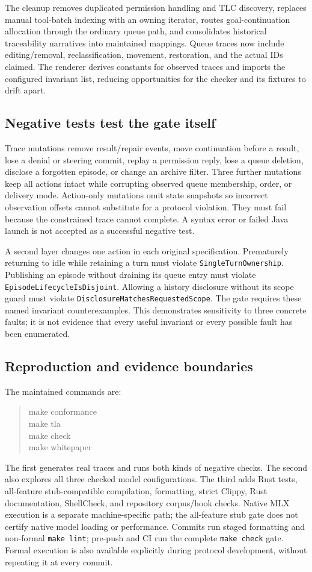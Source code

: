 \documentclass[10pt,letterpaper]{article}
\newcommand{\code}[1]{\texttt{#1}}
\begin{document}
The cleanup removes duplicated permission handling and TLC discovery, replaces
manual tool-batch indexing with an owning iterator, routes goal-continuation
allocation through the ordinary queue path, and consolidates historical
traceability narratives into maintained mappings. Queue traces now include
editing/removal, reclassification, movement, restoration, and the actual IDs
claimed. The renderer derives constants for observed traces and imports the
configured invariant list, reducing opportunities for the checker and its
fixtures to drift apart.

\subsection{Negative tests test the gate itself}
Trace mutations remove result/repair events, move continuation before a
result, lose a denial or steering commit, replay a permission reply, lose a
queue deletion, disclose a forgotten episode, or change an archive filter.
Three further mutations keep all actions intact while corrupting observed queue
membership, order, or delivery mode. Action-only mutations omit state snapshots
so incorrect observation offsets cannot substitute for a protocol violation.
They must fail because the constrained trace cannot complete. A syntax error
or failed Java launch is not accepted as a successful negative test.

A second layer changes one action in each original specification. Prematurely
returning to idle while retaining a turn must violate
\code{SingleTurnOwnership}. Publishing an episode without draining its queue
entry must violate \code{EpisodeLifecycleIsDisjoint}. Allowing a history
disclosure without its scope guard must violate
\code{DisclosureMatchesRequestedScope}. The gate requires these named
invariant counterexamples. This demonstrates sensitivity to three concrete
faults; it is not evidence that every useful invariant or every possible fault
has been enumerated.

\subsection{Reproduction and evidence boundaries}


The maintained commands are:
\begin{quote}\small\ttfamily
make conformance\\
make tla\\
make check\\
make whitepaper
\end{quote}
The first generates real traces and runs both kinds of negative checks. The
second also explores all three checked model configurations. The third adds
Rust tests, all-feature stub-compatible compilation, formatting, strict Clippy,
Rust documentation, ShellCheck, and repository corpus/hook checks. Native MLX
execution is a separate machine-specific path; the all-feature stub gate does
not certify native model loading or performance.
Commits run staged formatting and non-formal \code{make lint}; pre-push and CI
run the complete \code{make check} gate. Formal execution is also available
explicitly during protocol development, without repeating it at every commit.
\end{document}
